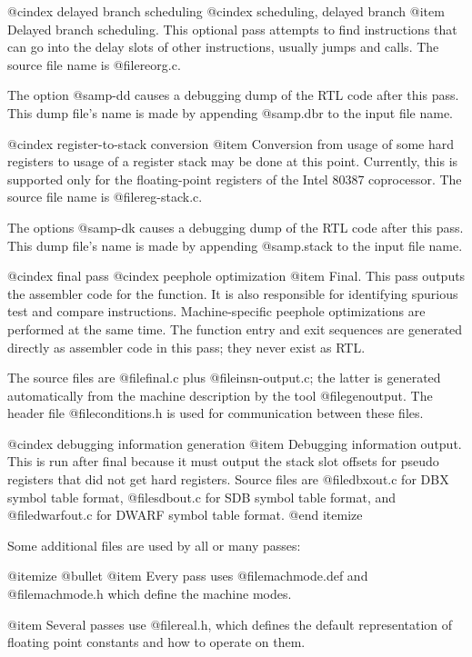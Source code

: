 @cindex delayed branch scheduling
@cindex scheduling, delayed branch
@item
Delayed branch scheduling.  This optional pass attempts to find
instructions that can go into the delay slots of other instructions,
usually jumps and calls.  The source file name is @file{reorg.c}.  

The option @samp{-dd} causes a debugging dump of the RTL code after
this pass.  This dump file's name is made by appending @samp{.dbr}
to the input file name.

@cindex register-to-stack conversion
@item
Conversion from usage of some hard registers to usage of a register
stack may be done at this point.  Currently, this is supported only
for the floating-point registers of the Intel 80387 coprocessor.   The
source file name is @file{reg-stack.c}.

The options @samp{-dk} causes a debugging dump of the RTL code after
this pass.  This dump file's name is made by appending @samp{.stack}
to the input file name.

@cindex final pass
@cindex peephole optimization
@item
Final.  This pass outputs the assembler code for the function.  It is
also responsible for identifying spurious test and compare
instructions.  Machine-specific peephole optimizations are performed
at the same time.  The function entry and exit sequences are generated
directly as assembler code in this pass; they never exist as RTL.

The source files are @file{final.c} plus @file{insn-output.c}; the
latter is generated automatically from the machine description by the
tool @file{genoutput}.  The header file @file{conditions.h} is used
for communication between these files.

@cindex debugging information generation
@item
Debugging information output.  This is run after final because it must
output the stack slot offsets for pseudo registers that did not get
hard registers.  Source files are @file{dbxout.c} for DBX symbol table
format, @file{sdbout.c} for SDB symbol table format, and
@file{dwarfout.c} for DWARF symbol table format.
@end itemize

Some additional files are used by all or many passes:

@itemize @bullet
@item
Every pass uses @file{machmode.def} and @file{machmode.h} which define
the machine modes.

@item
Several passes use @file{real.h}, which defines the default
representation of floating point constants and how to operate on them.

